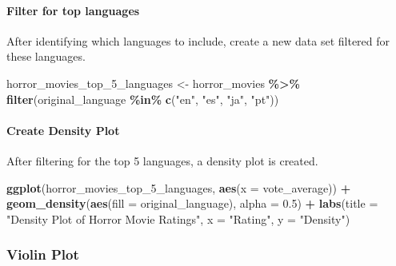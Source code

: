 \documentclass[
]{book}
\newenvironment{Shaded}{\begin{snugshade}}{\end{snugshade}}
\newcommand{\AttributeTok}[1]{\textcolor[rgb]{0.13,0.29,0.53}{#1}}
\newcommand{\FloatTok}[1]{\textcolor[rgb]{0.00,0.00,0.81}{#1}}
\newcommand{\FunctionTok}[1]{\textcolor[rgb]{0.13,0.29,0.53}{\textbf{#1}}}
\newcommand{\NormalTok}[1]{#1}
\newcommand{\OtherTok}[1]{\textcolor[rgb]{0.56,0.35,0.01}{#1}}
\newcommand{\SpecialCharTok}[1]{\textcolor[rgb]{0.81,0.36,0.00}{\textbf{#1}}}
\newcommand{\StringTok}[1]{\textcolor[rgb]{0.31,0.60,0.02}{#1}}
\begin{document}
\hypertarget{filter-for-top-languages}{%
\paragraph*{Filter for top languages}\label{filter-for-top-languages}}

After identifying which languages to include, create a new data set filtered for these languages.

\begin{Shaded}
\begin{Highlighting}[]
\NormalTok{horror\_movies\_top\_5\_languages }\OtherTok{\textless{}{-}}\NormalTok{ horror\_movies }\SpecialCharTok{\%\textgreater{}\%}
  \FunctionTok{filter}\NormalTok{(original\_language }\SpecialCharTok{\%in\%} \FunctionTok{c}\NormalTok{(}\StringTok{"en"}\NormalTok{, }\StringTok{"es"}\NormalTok{, }\StringTok{"ja"}\NormalTok{, }\StringTok{"pt"}\NormalTok{))}
\end{Highlighting}
\end{Shaded}

\hypertarget{create-density-plot}{%
\paragraph*{Create Density Plot}\label{create-density-plot}}

After filtering for the top 5 languages, a density plot is created.

\begin{Shaded}
\begin{Highlighting}[]
\FunctionTok{ggplot}\NormalTok{(horror\_movies\_top\_5\_languages, }\FunctionTok{aes}\NormalTok{(}\AttributeTok{x =}\NormalTok{ vote\_average)) }\SpecialCharTok{+}
  \FunctionTok{geom\_density}\NormalTok{(}\FunctionTok{aes}\NormalTok{(}\AttributeTok{fill =}\NormalTok{ original\_language), }\AttributeTok{alpha =} \FloatTok{0.5}\NormalTok{) }\SpecialCharTok{+}
  \FunctionTok{labs}\NormalTok{(}\AttributeTok{title =} \StringTok{"Density Plot of Horror Movie Ratings"}\NormalTok{,}
       \AttributeTok{x =} \StringTok{"Rating"}\NormalTok{,}
       \AttributeTok{y =} \StringTok{"Density"}\NormalTok{)}
\end{Highlighting}
\end{Shaded}

\hypertarget{violin-plot}{%
\subsubsection*{Violin Plot}\label{violin-plot}}
\end{document}

